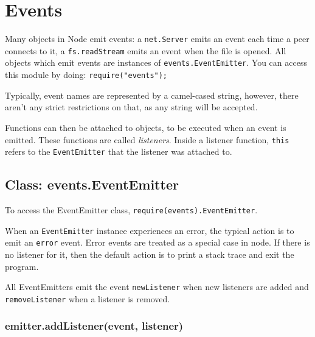 \section{Events}\label{events}

\begin{Shaded}
\begin{Highlighting}[]
 
\end{Highlighting}
\end{Shaded}

Many objects in Node emit events: a \texttt{net.Server} emits an event
each time a peer connects to it, a \texttt{fs.readStream} emits an event
when the file is opened. All objects which emit events are instances of
\texttt{events.EventEmitter}. You can access this module by doing:
\texttt{require("events");}

Typically, event names are represented by a camel-cased string, however,
there aren't any strict restrictions on that, as any string will be
accepted.

Functions can then be attached to objects, to be executed when an event
is emitted. These functions are called \emph{listeners}. Inside a
listener function, \texttt{this} refers to the \texttt{EventEmitter}
that the listener was attached to.

\subsection{Class: events.EventEmitter}\label{class-events.eventemitter}

To access the EventEmitter class,
\texttt{require(\textquotesingle{}events\textquotesingle{}).EventEmitter}.

When an \texttt{EventEmitter} instance experiences an error, the typical
action is to emit an \texttt{\textquotesingle{}error\textquotesingle{}}
event. Error events are treated as a special case in node. If there is
no listener for it, then the default action is to print a stack trace
and exit the program.

All EventEmitters emit the event
\texttt{\textquotesingle{}newListener\textquotesingle{}} when new
listeners are added and
\texttt{\textquotesingle{}removeListener\textquotesingle{}} when a
listener is removed.

\subsubsection{emitter.addListener(event,
listener)}\label{emitter.addlistenerevent-listener}

